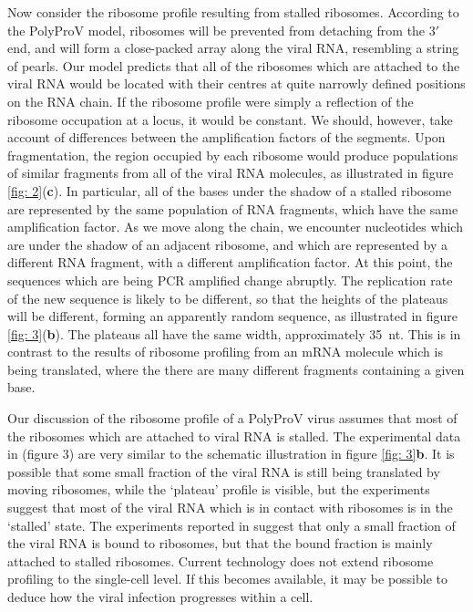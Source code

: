 \documentclass[12pt]{iopart}
\begin{document}
Now consider the ribosome profile resulting from stalled ribosomes. 
According to the PolyProV model, ribosomes will be prevented from detaching 
from the $3'$ end, and will form a close-packed array along the viral RNA, resembling 
a string of pearls.  Our model predicts that all of the ribosomes which are attached 
to the viral RNA would be located with their centres at quite narrowly defined 
positions on the RNA chain. If the ribosome profile were simply a reflection 
of the ribosome occupation at a locus, it would be constant. We should, however, 
take account of differences between the amplification factors of the segments.
Upon fragmentation, the region occupied by each ribosome 
would produce populations of similar fragments from all of the viral RNA molecules, as illustrated 
in figure \ref{fig: 2}({\bf c}). In particular, all of the bases under the shadow of a stalled ribosome 
are represented by the same population of RNA fragments, which have the same 
amplification factor. As we move along the chain, we encounter nucleotides 
which are under the shadow of an adjacent ribosome, and which are represented 
by a different RNA fragment, with a different amplification factor. 
At this point, the sequences which are being PCR amplified change abruptly. 
The replication rate of the new sequence is likely to be different, so that the 
heights of the plateaus will be different, forming an apparently random sequence, 
as illustrated in figure \ref{fig: 3}({\bf b}). The plateaus all have the same width, 
approximately 35~nt. This is in contrast to the results of ribosome profiling 
from an mRNA molecule which is being translated, where the there are many 
different fragments containing a given base. 

Our discussion of the ribosome profile of a PolyProV virus assumes that most of the 
ribosomes which are attached to viral RNA is stalled. The experimental data in \cite{Ret+20}
(figure 3) are very similar to the schematic illustration in figure \ref{fig: 3}{\bf b}. It is possible that 
some small fraction of the viral RNA is still being translated by moving ribosomes, while the \lq plateau' 
profile is visible, but the experiments suggest that most of the viral RNA which is in contact with 
ribosomes is in the \lq stalled' state. The experiments reported in \cite{Ret+20} suggest that only a small fraction 
of the viral RNA is bound to ribosomes, but that the bound fraction is mainly attached to stalled ribosomes. 
Current technology does not extend ribosome profiling to the single-cell level. If this becomes available, 
it may be possible to deduce how the viral infection progresses within a cell.
\end{document}
